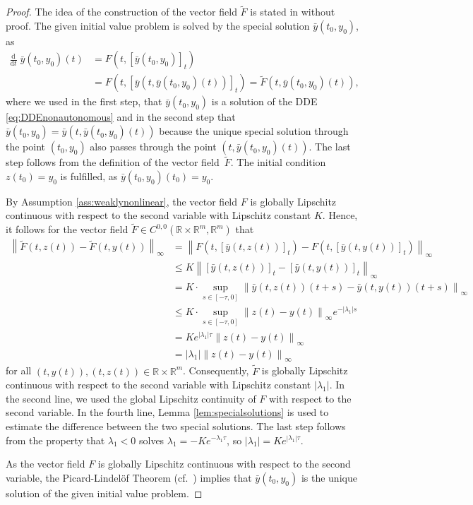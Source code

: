 \documentclass[10pt]{article}
\numberwithin{equation}{section}
\newcommand*{\dd}{\mathrm{d}}
\newcommand\norm[1]{\left\lVert#1\right\rVert}
\newcommand\abs[1]{\left\lvert#1\right\rvert}
\begin{document}
	
	\begin{proof}
		The idea of the construction of the vector field $\widetilde{F}$ is stated in \cite{Chicone2003} without proof. The given initial value problem is solved by the special solution $\bar{y}(t_0,y_0)$, as
		\begin{align*}
			\frac{\dd}{\dd t} \; \bar{y}(t_0,y_0)(t) & = F(t,[\bar{y}(t_0,y_0)]_t) \\
			& =  F(t,[\bar{y}(t,\bar{y}(t_0,y_0)(t))]_t) =  \widetilde F(t,\bar{y}(t_0,y_0)(t)),
		\end{align*}
		where we used in the first step, that $\bar{y}(t_0,y_0)$ is a solution of the DDE \eqref{eq:DDEnonautonomous} and in the second step that $\bar{y}(t_0,y_0) = \bar{y}(t,\bar{y}(t_0,y_0)(t))$ because the unique special solution through the point $(t_0,y_0)$ also passes through the point $(t,\bar{y}(t_0,y_0)(t))$. The last step follows from the definition of the vector field~$\widetilde{F}$. The initial condition $z(t_0) = y_0$ is fulfilled, as $\bar{y}(t_0,y_0)(t_0) = y_0$.
		
		By Assumption \ref{ass:weaklynonlinear}, the vector field $F$ is globally Lipschitz continuous with respect to the second variable with Lipschitz constant $K$. Hence, it follows for the vector field $\widetilde{F}\in C^{0,0}(\mathbb{R} \times \mathbb{R}^m,\mathbb{R}^m)$ that
		\begin{align*}
			\norm{\widetilde{F}(t,z(t))-\widetilde{F}(t,y(t))}_\infty& =  \norm{F(t,[\bar{y}(t,z(t))]_t)-F(t,[\bar{y}(t,y(t))]_t)}_\infty \\
			&\leq   K \norm{[\bar{y}(t,z(t))]_t - [\bar{y}(t,y(t))]_t}_\infty  \\
			&= K \cdot \sup_{s \in [-\tau,0]} \norm{\bar{y}(t,z(t))(t+s) - \bar{y}(t,y(t))(t+s)}_\infty \\
			& \leq  K \cdot \sup_{s \in [-\tau,0]} \norm{z(t)-y(t)}_\infty e^{-\vert \lambda_1\vert  s} \\
			& =  K e^{\vert\lambda_1 \vert \tau}\norm{z(t)-y(t)}_\infty \\
			& = \vert\lambda_1 \vert\norm{z(t)-y(t)}_\infty
		\end{align*}
		for all $(t,y(t)),(t,z(t))\in \mathbb{R}\times \mathbb{R}^m$. Consequently, $\widetilde{F}$ is globally Lipschitz continuous with respect to the second variable with Lipschitz constant $\vert \lambda_1 \vert $. In the second line, we used the global Lipschitz continuity of $F$ with respect to the second variable. In the fourth line, Lemma \ref{lem:specialsolutions} is used to estimate the difference between the two special solutions. The last step follows from the property that $\lambda_1<0$ solves $\lambda_1 = -K e^{-\lambda_1 \tau}$, so $\abs{\lambda_1} = Ke^{\abs{\lambda_1}\tau}$.   
		
		As the vector field $F$ is globally Lipschitz continuous with respect to the second variable, the Picard-Lindelöf Theorem (cf.\ \cite{Hartman2002}) implies that $\bar{y}(t_0,y_0)$ is the unique solution of the given initial value problem. 
	\end{proof}
	
\end{document}
